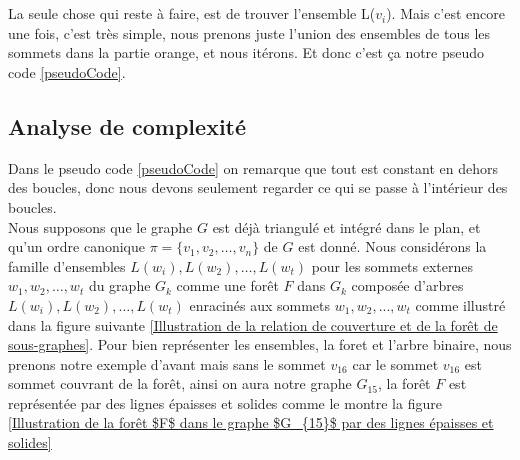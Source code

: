 \documentclass[hidelinks,letterpaper,12pt]{article}
\begin{document}
\\ \\
La seule chose qui reste à faire, est de trouver l'ensemble L($v_i$). Mais c'est encore une fois, c'est très simple, nous prenons juste l'union des ensembles de tous les sommets dans la partie orange, et nous itérons. Et donc c'est ça notre pseudo code \ref{pseudoCode}.






\subsection{Analyse de complexité}
\label{Analyse de complexité}
Dans le pseudo code \ref{pseudoCode} on remarque que tout est constant en dehors des boucles, donc nous devons seulement regarder ce qui se passe à l’intérieur des boucles.
\\
Nous supposons que le graphe $G$ est déjà triangulé et intégré dans le plan, et qu'un ordre canonique \( \pi = \{v_1, v_2, \dots, v_n\} \) de $G$ est donné. Nous considérons la famille d'ensembles \(L(w_i), L(w_2), \dots, L(w_t)\) pour les sommets externes \(w_1, w_2, \dots, w_t\) du graphe $G_k$ comme une forêt $F$ dans $G_k$ composée d'arbres \(L(w_i), L(w_2),\dots, L(w_t)\) enracinés aux sommets \(w_1, w_2, ..., w_t\) comme illustré dans la figure suivante \ref{Illustration de la relation de couverture et de la forêt de sous-graphes}. Pour bien représenter les ensembles, la foret et l'arbre binaire, nous prenons notre exemple d'avant mais sans le sommet $v_{16}$ car le sommet $v_{16}$ est sommet couvrant de la forêt, ainsi on aura notre graphe $G_{15}$, la forêt $F$ est représentée par des lignes épaisses et solides comme le montre la figure \ref{Illustration de la forêt $F$ dans le graphe $G_{15}$ par des lignes épaisses et solides} 
\end{document}
